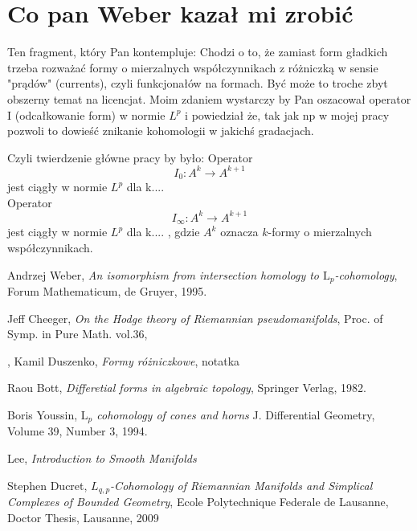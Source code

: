 \documentclass[licencjacka]{pracamgr}
\theoremstyle{definition}
\theoremstyle{definition}
\theoremstyle{plain}
\theoremstyle{plain}
\begin{document}
\section{Co pan Weber kazał mi zrobić}
Ten fragment, który Pan kontempluje: Chodzi o to, że zamiast form gładkich
trzeba rozważać formy o mierzalnych współczynnikach z różniczką w sensie
"prądów" (currents), czyli funkcjonałów na formach. Być może to troche zbyt
obszerny temat na licencjat. Moim zdaniem wystarczy by Pan oszacował operator I
(odcałkowanie form) w normie $L^p$ i powiedział że, tak jak np w mojej pracy
pozwoli to dowieść znikanie kohomologii w jakichś gradacjach.

Czyli twierdzenie główne pracy by było: Operator
\[
 I_0:A^k \to A^{k+1}
\]
jest ciągły w normie $L^p$ dla k.... \\

Operator
\[
I_\infty:A^k \to A^{k+1}
\] jest ciągły w normie $L^p$ dla k.... ,
gdzie $A^k$ oznacza $k$-formy o mierzalnych współczynnikach. \\



\begin{thebibliography}{99}

 Andrzej Weber, \textit{An isomorphism from
  intersection homology to $\mathrm{L}_p$-cohomology}, Forum
  Mathematicum, de Gruyer, 1995.
  
 Jeff Cheeger, \textit{On the Hodge theory
  of Riemannian pseudomanifolds}, Proc. of Symp. in Pure Math. vol.36,

, Kamil Duszenko, \textit{Formy różniczkowe},
notatka

 Raou Bott, \textit{Differetial forms in algebraic
  topology}, Springer Verlag, 1982.

 Boris Youssin, \textit{$\mathrm{L}_p$
  cohomology of cones and horns } J. Differential Geometry, Volume 39,
  Number 3, 1994.
  
 Lee, \textit{Introduction to Smooth Manifolds}

 Stephen Ducret, \textit{$L_{q,p}$-Cohomology of Riemannian
    Manifolds and Simplical Complexes of Bounded Geometry}, Ecole Polytechnique Federale
    de Lausanne, Doctor Thesis, Lausanne, 2009

\end{thebibliography}
\end{document}
